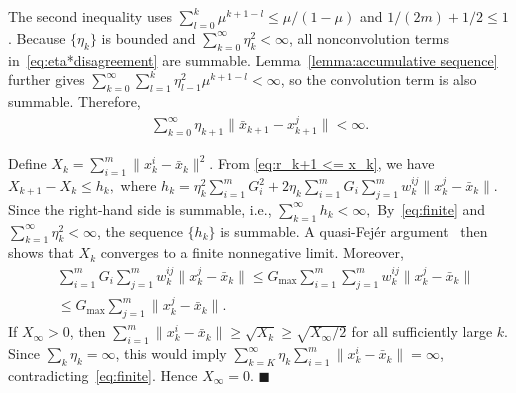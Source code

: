 \documentclass[twocolumn]{autart}    %
\newcommand{\1}{\mathbf{1}}
\begin{document}
The second inequality uses $\sum_{l=0}^k\mu^{k+1-l}\le\mu/(1-\mu)$ and $1/(2m)+1/2\le1$. Because $\{\eta_k\}$ is bounded and $\sum_{k=0}^\infty\eta_k^2<\infty$, all nonconvolution terms in~\eqref{eq:eta*disagreement} are summable. Lemma~\ref{lemma:accumulative sequence} further gives $\sum_{k=0}^\infty\sum_{l=1}^k\eta_{l-1}^2\mu^{k+1-l}<\infty$, so the convolution term is also summable. Therefore,
\begin{align}
    \sum_{k=0}^\infty  \eta_{k+1} \|\bar{x}_{k+1}-x_{k+1}^j\|   < \infty. \label{eq:finite}
\end{align}

 
 
Define
$
X_k=\sum_{i=1}^m\|x_k^i-\bar x_k\|^2 .
$
From \eqref{eq:r_k+1 <= x_k}, we have
$
X_{k+1}-X_k\le h_k,
$
where
$
h_k= 
\eta_k^2\sum_{i=1}^mG_i^2
+
2\eta_k\sum_{i=1}^mG_i
\sum_{j=1}^m w_k^{ij}\|x_k^j-\bar x_k\|.
$
Since the right-hand side is summable, i.e.,
$
\sum_{k=1}^{\infty}h_k<\infty,
$
By~\eqref{eq:finite} and $\sum_{k=1}^\infty\eta_k^2<\infty$, the sequence $\{h_k\}$ is summable. A quasi-Fej\'er argument~\cite{combettes2001quasi} then shows that $X_k$ converges to a finite nonnegative limit.
Moreover, 
\begin{align*}
&\sum_{i=1}^mG_i
\sum_{j=1}^m w_k^{ij}\|x_k^j-\bar x_k\| \le G_{\max}\sum_{i=1}^m 
\sum_{j=1}^m w_k^{ij}\|x_k^j-\bar x_k\| \\
&\le G_{\max}\sum_{j=1}^m \|x_k^j-\bar x_k\|.
\end{align*}
If $X_\infty>0$, then $\sum_{i=1}^m\|x_k^i-\bar x_k\|\ge\sqrt{X_k}\ge\sqrt{X_\infty/2}$ for all sufficiently large $k$. Since $\sum_k\eta_k=\infty$, this would imply $\sum_{k=K}^\infty\eta_k\sum_{i=1}^m\|x_k^i-\bar x_k\|=\infty$, contradicting~\eqref{eq:finite}. Hence $X_\infty=0$.
\hfill $\blacksquare$
 
\end{document}
